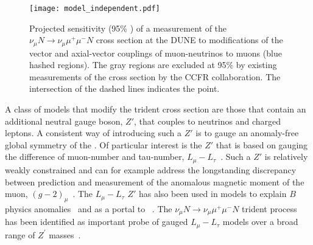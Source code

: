 \begin{figure}[tb!]
\centering
\texttt{[image: model\_independent.pdf]}
\caption[Projected sensitivity of $\nu_\mu N \to \nu_\mu \mu^+\mu^- N$ cross section at the  to modifications of the vector and axial-vector couplings of \numu{}s to muons]{Projected sensitivity (95\% ) of a measurement of the $\nu_\mu N \to \nu_\mu \mu^+\mu^- N$ cross section at the DUNE   to modifications of the vector and axial-vector couplings of muon-neutrinos to muons (blue hashed regions). The gray regions are excluded at 95\%  by existing measurements of the cross section by the CCFR collaboration. The intersection of the dashed lines indicates the  point.}
\label{fig:trident_gVgA}
\end{figure}

A class of models that modify the trident cross section are those that contain an additional neutral gauge boson, $Z'$, that couples to neutrinos and charged leptons. A consistent way of introducing such a $Z'$ is to gauge an anomaly-free global symmetry of the . Of particular interest is the $Z'$ that is based on gauging the difference of muon-number and tau-number, $L_\mu - L_\tau$~\cite{He:1990pn,He:1991qd}. Such a $Z'$ is relatively weakly constrained and can for example address the longstanding discrepancy between  prediction and measurement of the anomalous magnetic moment of the muon, $(g-2)_\mu$~\cite{Baek:2001kca,Harigaya:2013twa}. The $L_\mu - L_\tau$ $Z'$ has also been used in models to explain $B$ physics anomalies~\cite{Altmannshofer:2014cfa} and as a portal to ~\cite{Baek:2008nz,Altmannshofer:2016jzy}. The $\nu_\mu N \to \nu_\mu \mu^+\mu^- N$ trident process has been identified as important probe of gauged $L_\mu - L_\tau$ models over a broad range of $Z^\prime$ masses~\cite{Altmannshofer:2014cfa,Altmannshofer:2014pba}.


